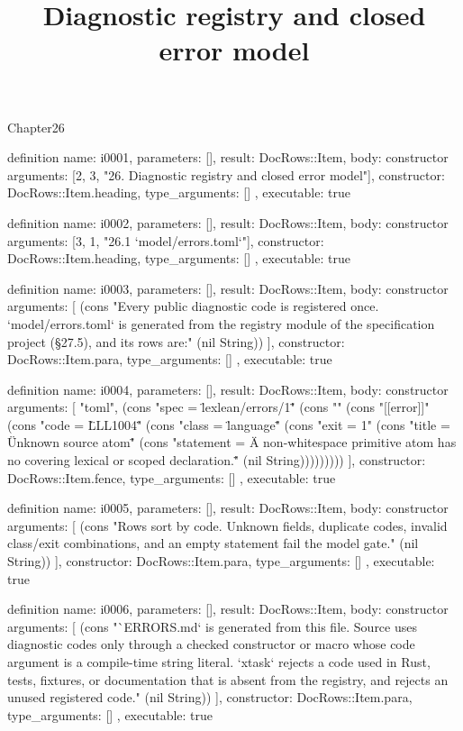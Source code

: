 \begin{lexlean}{Chapter26}
\title{Diagnostic registry and closed error model}
\begin{semanticmodule}
definition{
  name: i0001,
  parameters: [],
  result: DocRows::Item,
  body: constructor{
    arguments: [2, 3, "26. Diagnostic registry and closed error model"],
    constructor: DocRows::Item.heading,
    type_arguments: []
  },
  executable: true
}

definition{
  name: i0002,
  parameters: [],
  result: DocRows::Item,
  body: constructor{
    arguments: [3, 1, "26.1 `model/errors.toml`"],
    constructor: DocRows::Item.heading,
    type_arguments: []
  },
  executable: true
}

definition{
  name: i0003,
  parameters: [],
  result: DocRows::Item,
  body: constructor{
    arguments: [
      (cons "Every public diagnostic code is registered once. `model/errors.toml` is generated from the registry module of the specification project (§27.5), and its rows are:" (nil String))
    ],
    constructor: DocRows::Item.para,
    type_arguments: []
  },
  executable: true
}

definition{
  name: i0004,
  parameters: [],
  result: DocRows::Item,
  body: constructor{
    arguments: [
      "toml",
      (cons "spec = \"lexlean/errors/1\"" (cons "" (cons "[[error]]" (cons "code = \"LLL1004\"" (cons "class = \"language\"" (cons "exit = 1" (cons "title = \"Unknown source atom\"" (cons "statement = \"A non-whitespace primitive atom has no covering lexical or scoped declaration.\"" (nil String)))))))))
    ],
    constructor: DocRows::Item.fence,
    type_arguments: []
  },
  executable: true
}

definition{
  name: i0005,
  parameters: [],
  result: DocRows::Item,
  body: constructor{
    arguments: [
      (cons "Rows sort by code. Unknown fields, duplicate codes, invalid class/exit combinations, and an empty statement fail the model gate." (nil String))
    ],
    constructor: DocRows::Item.para,
    type_arguments: []
  },
  executable: true
}

definition{
  name: i0006,
  parameters: [],
  result: DocRows::Item,
  body: constructor{
    arguments: [
      (cons "`ERRORS.md` is generated from this file. Source uses diagnostic codes only through a checked constructor or macro whose code argument is a compile-time string literal. `xtask` rejects a code used in Rust, tests, fixtures, or documentation that is absent from the registry, and rejects an unused registered code." (nil String))
    ],
    constructor: DocRows::Item.para,
    type_arguments: []
  },
  executable: true
}


\end{semanticmodule}
\end{lexlean}
